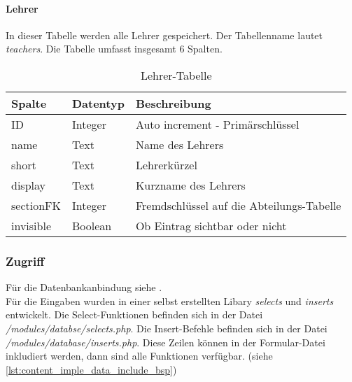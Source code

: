 \paragraph{Lehrer\\}
In dieser Tabelle werden alle Lehrer gespeichert. Der Tabellenname lautet \textit{teachers}. Die Tabelle umfasst insgesamt 6 Spalten.

\begin{table}[H]
\centering
\begin{tabular}{p{2.5 cm}p{2.5 cm}p{10 cm}}
   \toprule
   \textbf{Spalte} & \textbf{Datentyp} & \textbf{Beschreibung} \\
   \midrule
          ID & Integer & Auto increment - Primärschlüssel  \\
          \hline
          name & Text & Name des Lehrers \\
          \hline
	      short & Text & Lehrerkürzel   \\
	      \hline
          display & Text & Kurzname des Lehrers   \\
          \hline
          sectionFK & Integer & Fremdschlüssel auf die Abteilungs-Tabelle   \\
          \hline
          invisible & Boolean & Ob Eintrag sichtbar oder nicht \\
   \bottomrule
\end{tabular}
\caption{Lehrer-Tabelle}
\end{table}

\subsubsection{Zugriff}
% 
Für die Datenbankanbindung siehe .\\
Für die Eingaben wurden in einer selbst erstellten Libary \textit{selects} und \textit{inserts} entwickelt. Die Select-Funktionen befinden sich in der Datei \textit{/modules/databse/selects.php}. Die Insert-Befehle befinden sich in der Datei \textit{/modules/database/inserts.php}. Diese Zeilen können in der Formular-Datei inkludiert werden, dann sind alle Funktionen verfügbar. (siehe \autoref{lst:content_imple_data_include_bsp})



